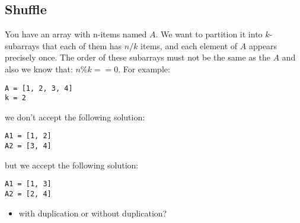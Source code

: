 \subsection{Shuffle}

You have an array with n-items named $A$.
We want to partition it into $k$-subarrays that each of them has $n/k$ items, and each element of $A$ appears precisely once.
The order of these subarrays must not be the same as the $A$ and also we know that: $n \% k == 0$.
For example:

\begin{verbatim}
A = [1, 2, 3, 4]
k = 2
\end{verbatim}

we don't accept the following solution:

\begin{verbatim}
A1 = [1, 2]
A2 = [3, 4]
\end{verbatim}

but we accept the following solution:

\begin{verbatim}
A1 = [1, 3]
A2 = [2, 4]
\end{verbatim}

\begin{itemize}
  \item with duplication or without duplication?
\end{itemize}
